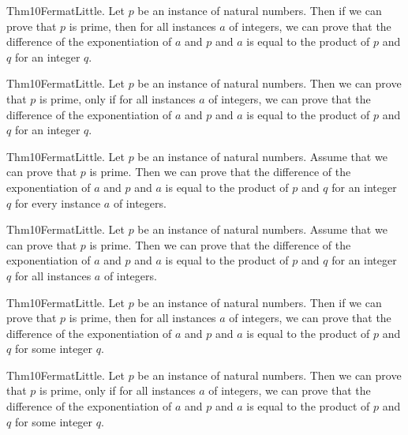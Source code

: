 \documentclass{article}
\begin{document}
Thm10FermatLittle. Let $p$ be an instance of natural numbers. Then if we can prove that $p$ is prime, then for all instances $a$ of integers, we can prove that the difference of the exponentiation of $a$ and $p$ and $a$ is equal to the product of $p$ and $q$ for an integer $q$.

Thm10FermatLittle. Let $p$ be an instance of natural numbers. Then we can prove that $p$ is prime, only if for all instances $a$ of integers, we can prove that the difference of the exponentiation of $a$ and $p$ and $a$ is equal to the product of $p$ and $q$ for an integer $q$.

Thm10FermatLittle. Let $p$ be an instance of natural numbers. Assume that we can prove that $p$ is prime. Then we can prove that the difference of the exponentiation of $a$ and $p$ and $a$ is equal to the product of $p$ and $q$ for an integer $q$ for every instance $a$ of integers.

Thm10FermatLittle. Let $p$ be an instance of natural numbers. Assume that we can prove that $p$ is prime. Then we can prove that the difference of the exponentiation of $a$ and $p$ and $a$ is equal to the product of $p$ and $q$ for an integer $q$ for all instances $a$ of integers.

Thm10FermatLittle. Let $p$ be an instance of natural numbers. Then if we can prove that $p$ is prime, then for all instances $a$ of integers, we can prove that the difference of the exponentiation of $a$ and $p$ and $a$ is equal to the product of $p$ and $q$ for some integer $q$.

Thm10FermatLittle. Let $p$ be an instance of natural numbers. Then we can prove that $p$ is prime, only if for all instances $a$ of integers, we can prove that the difference of the exponentiation of $a$ and $p$ and $a$ is equal to the product of $p$ and $q$ for some integer $q$.
\end{document}
